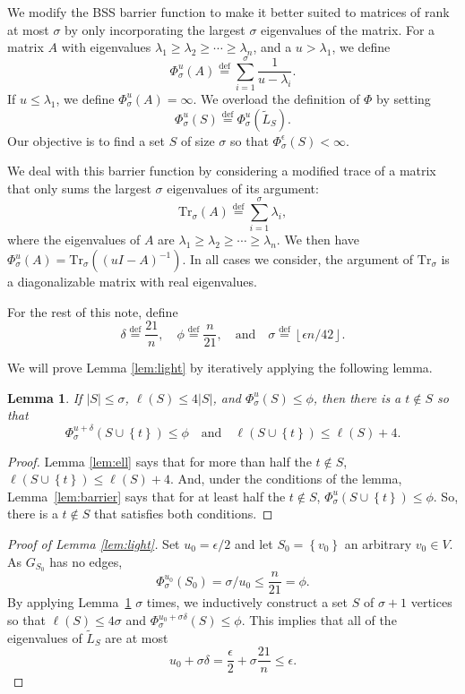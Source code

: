 \documentclass[11pt]{article}
\def\Ltil{\widetilde{L}}
\def\union{\cup}
\def\floor#1{\left\lfloor #1 \right\rfloor}
\def\defeq{\stackrel{\mathrm{def}}{=}}
\def\setof#1{\left\{#1  \right\}}
\def\sizeof#1{\left|#1  \right|}
\def\trs#1{\mathrm{Tr}_{\sigma} \left(#1 \right)}
\def\Trs{\mathrm{Tr}_{\sigma}}
\newtheorem{lemma}[theorem]{Lemma}
\begin{document}
We modify the BSS barrier function to make it better suited to matrices of rank at most $\sigma$ by only incorporating the largest $\sigma$ eigenvalues of the matrix. 
For a matrix $A$ with eigenvalues $\lambda_1 \geq \lambda_2 \geq \dotsb \geq \lambda_n$, and a $u > \lambda_1$, we define
\[
  \Phi^{u}_{\sigma} (A) \defeq \sum_{i=1}^{\sigma}\frac{1}{u - \lambda_{i}}.
\]
If $u \leq \lambda_1$, we define $\Phi^{u}_{\sigma} (A) = \infty$.
We overload the definition of $\Phi $ by setting
\[
  \Phi^{u}_{\sigma} (S) \defeq \Phi^{u}_{\sigma} (\Ltil_{S}).
\]
Our objective is to find a set $S$ of size $\sigma$ so that $\Phi^{\epsilon}_{\sigma} (S) < \infty$.

We deal with this barrier function by considering a modified trace of a matrix that only sums the largest $\sigma$ eigenvalues of its argument:
\[
  \trs{A} \defeq \sum_{i=1}^{\sigma}\lambda_{i},
\]
where the eigenvalues of $A$ are $\lambda_1 \geq \lambda_2 \geq \dotsb \geq \lambda_n$.
We then have $\Phi^{u}_{\sigma} (A) = \trs{\left(u I - A\right)^{-1}}$.
In all cases we consider, the argument of $\Trs$ is a diagonalizable matrix with real eigenvalues.


For the rest of this note, define 
\[
  \delta \defeq  \frac{21}{n},
\quad 
  \phi \defeq \frac{n}{21},
  \quad \mathrm{and} \quad 
  \sigma \defeq \floor{\epsilon n / 42}.
\]

We will prove Lemma \ref{lem:light} by iteratively applying the following lemma. 

\begin{lemma}\label{lem:oneStep}
If $\sizeof{S} \leq \sigma$, $\ell(S) \leq 4 \sizeof{S}$, and
  $\Phi^{u}_{\sigma} (S) \leq \phi$,
  then there is a $t \not \in S$ so that
\[
  \Phi^{u+\delta}_{\sigma} (S \union \setof{t}) \leq \phi 
  \quad \mathrm{and} \quad 
  \ell(S \union \setof{t}) \leq \ell(S) + 4.
\]
\end{lemma}
\begin{proof}
Lemma \ref{lem:ell} says that for more than half the $t \not \in S$, $\ell(S \union \setof{t}) \leq \ell(S) + 4$.
And, under the conditions of the lemma, 
  Lemma~\ref{lem:barrier} says that for at least half the $t \not \in S$, $\Phi^{u}_{\sigma} (S \union \setof{t}) \leq \phi$.
So, there is a $t \not \in S$ that satisfies both conditions.
\end{proof}


\begin{proof}[Proof of Lemma \ref{lem:light}]
Set $u_{0} = \epsilon / 2$ and let $S_0 = \setof{v_0}$ an arbitrary $v_0 \in V$.
As $G_{S_0}$ has no edges, 
\[
  \Phi^{u_{0}}_{\sigma} (S_{0}) = \sigma / u_{0} \leq \frac{n}{21} = \phi .
\]
By applying Lemma~\ref{lem:oneStep} $\sigma$ times, we inductively construct a set $S$
  of $\sigma + 1$ vertices so that $\ell(S) \leq 4 \sigma$ and
  $\Phi^{u_{0} + \sigma \delta}_{\sigma} (S) \leq  \phi$.
This implies that all of the eigenvalues of $\Ltil_{S}$ are at most
\[
 u_{0} + \sigma \delta = \frac{\epsilon}{2} + \sigma \frac{21}{n} 
 \leq \epsilon .
\]

\end{proof} 
\end{document}
